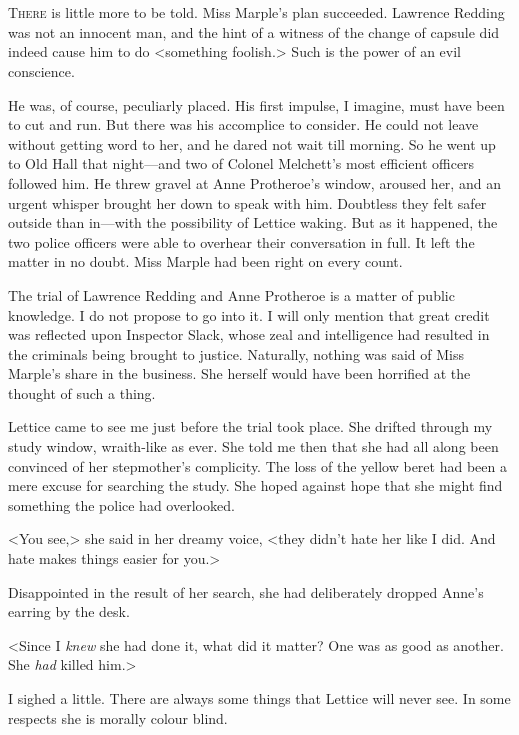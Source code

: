 \chapter[Chapter  \thechapter]{}


\lettrine{T}{here} is little more to be told. Miss Marple's plan succeeded. Lawrence Redding was not an innocent man, and the hint of a witness of the change of capsule did indeed cause him to do <something foolish.> Such is the power of an evil conscience.

He was, of course, peculiarly placed. His first impulse, I imagine, must have been to cut and run. But there was his accomplice to consider. He could not leave without getting word to her, and he dared not wait till morning. So he went up to Old Hall that night—and two of Colonel Melchett's most efficient officers followed him. He threw gravel at Anne Protheroe's window, aroused her, and an urgent whisper brought her down to speak with him. Doubtless they felt safer outside than in—with the possibility of Lettice waking. But as it happened, the two police officers were able to overhear their conversation in full. It left the matter in no doubt. Miss Marple had been right on every count.

The trial of Lawrence Redding and Anne Protheroe is a matter of public knowledge. I do not propose to go into it. I will only mention that great credit was reflected upon Inspector Slack, whose zeal and intelligence had resulted in the criminals being brought to justice. Naturally, nothing was said of Miss Marple's share in the business. She herself would have been horrified at the thought of such a thing.

Lettice came to see me just before the trial took place. She drifted through my study window, wraith-like as ever. She told me then that she had all along been convinced of her stepmother's complicity. The loss of the yellow beret had been a mere excuse for searching the study. She hoped against hope that she might find something the police had overlooked.

<You see,> she said in her dreamy voice, <they didn't hate her like I did. And hate makes things easier for you.>

Disappointed in the result of her search, she had deliberately dropped Anne's earring by the desk.

<Since I \emph{knew} she had done it, what did it matter? One was as good as another. She \emph{had} killed him.>

I sighed a little. There are always some things that Lettice will never see. In some respects she is morally colour blind.

